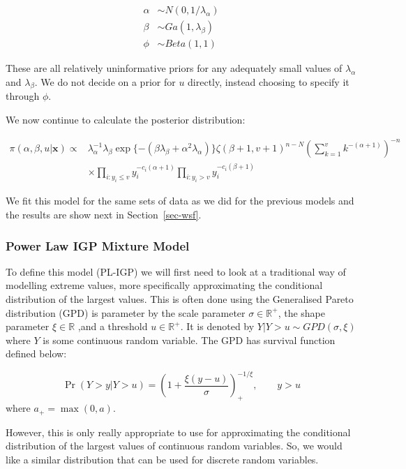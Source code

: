 \documentclass[
]{article}
\begin{document}
\begin{align*}
\alpha &\sim N(0,1/\lambda_\alpha)\\
\beta &\sim Ga(1,\lambda_\beta)\\
\phi &\sim Beta(1,1)
\end{align*}

These are all relatively uninformative priors for any adequately small
values of \(\lambda_\alpha\) and \(\lambda_\beta\). We do not decide on
a prior for \(u\) directly, instead choosing to specify it through
\(\phi\).

We now continue to calculate the posterior distribution:

\begin{align*}
\pi(\alpha, \beta, u|\boldsymbol{x}) \propto &\lambda_\alpha^{-1}\lambda_\beta\exp\{-(\beta\lambda_\beta + \alpha^2\lambda_\alpha)\}\zeta(\beta+1, v+1)^{n-N}\left(\sum_{k=1}^v k^{-(\alpha+1)}\right)^{-n}\\&\times\prod_{i:y_i\le v}y_i^{-c_i(\alpha+1)}\prod_{i:y_i>v}y_i^{-c_i(\beta+1)}
%
\end{align*}

We fit this model for the same sets of data as we did for the previous
models and the results are show next in Section~\ref{sec-wsf}.

\hypertarget{sec-pli}{%
\subsubsection{Power Law IGP Mixture Model}\label{sec-pli}}

To define this model (PL-IGP) we will first need to look at a
traditional way of modelling extreme values, more specifically
approximating the conditional distribution of the largest values. This
is often done using the Generalised Pareto distribution (GPD) is
parameter by the scale parameter \(\sigma\in \mathbb{R}^+\), the shape
parameter \(\xi \in \mathbb{R}\) ,and a threshold \(u\in \mathbb{R}^+\).
It is denoted by \(Y|Y>u \sim GPD(\sigma,\xi)\) where \(Y\) is some
continuous random variable. The GPD has survival function defined below:

\[
\Pr(Y>y|Y>u) = \left(1+\frac{\xi(y-u)}{\sigma}\right)_+^{-1/\xi}, \qquad y>u
\] where \(a_+ = \max(0,a)\).

However, this is only really appropriate to use for approximating the
conditional distribution of the largest values of continuous random
variables. So, we would like a similar distribution that can be used for
discrete random variables.
\end{document}
